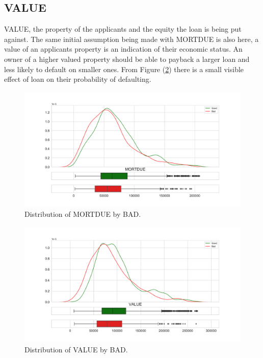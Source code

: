 \subsection*{VALUE}

VALUE,  the property of the applicants and the equity the loan is being put against. The same initial assumption being made with MORTDUE is also here,  a value of an applicants property is an indication of their economic status. An owner of a higher valued property should be able to payback a larger loan and less likely to default on smaller ones. From Figure (\ref{value_dist}) there is a small visible effect of loan on their probability of defaulting.

\begin{figure}[H]
	\centering
	\includegraphics[scale=0.40]{figs/mortdue_dist.pdf}
	\caption{Distribution of MORTDUE by BAD. \label{mortdue_dist}}
\end{figure}

\begin{figure}[H]
	\centering
	\includegraphics[scale=0.40]{figs/value_dist.pdf}
	\caption{Distribution of VALUE by BAD. \label{value_dist}}
\end{figure}

